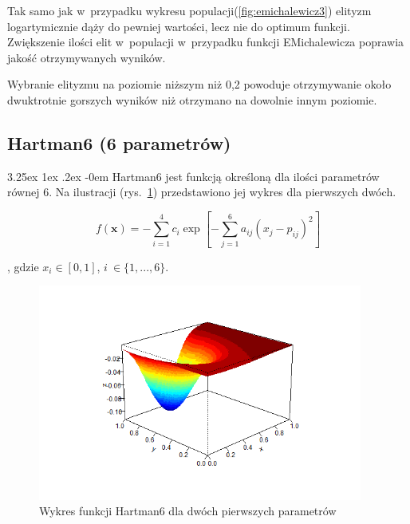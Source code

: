 \documentclass[11pt, a4paper]{article}
\makeatletter
\newcommand{\fbi}{\leavevmode{\parindent=1em\indent}}
\renewcommand\paragraph{\@startsection{paragraph}{5}{\z@}
  {3.25ex \@plus1ex \@minus.2ex}
  {-0em}
  {\normalfont\normalsize\bfseries}}
\makeatother
\begin{document}
\fbi
Tak samo jak w~przypadku wykresu populacji(\ref{fig:emichalewicz3}) elityzm logartymicznie dąży do pewniej wartości, lecz nie do optimum funkcji. Zwiększenie ilości elit w~populacji w~przypadku funkcji EMichalewicza poprawia jakość otrzymywanych wyników.

\fbi
Wybranie elityzmu na poziomie niższym niż 0,2 powoduje otrzymywanie około dwuktrotnie gorszych wyników niż otrzymano na dowolnie innym poziomie.

\newpage
\subsection{Hartman6 (6 parametrów)}
\paragraph{}
Hartman6 jest funkcją określoną dla ilości parametrów równej 6. Na ilustracji (rys.~\ref{fig:hartman61}) przedstawiono jej wykres dla pierwszych dwóch.

\begin{equation}\label{eq:hartman6}
f(\boldsymbol{x}) = - \sum_{i=1}^{4} c_i \exp[- \sum_{j=1}^{6} a_{ij}(x_j - p_{ij})^2]
\end{equation}

, gdzie $ x_i \in [0, 1] $, $ i~\in \{1, ..., 6\} $.

\begin{figure}[H]
	\begin{center}
		\includegraphics[width=0.95\textwidth]{./assets/Hartman61.png}
		\caption{Wykres funkcji Hartman6 dla dwóch pierwszych parametrów}
		\label{fig:hartman61}
	\end{center}
\end{figure}
\end{document}
